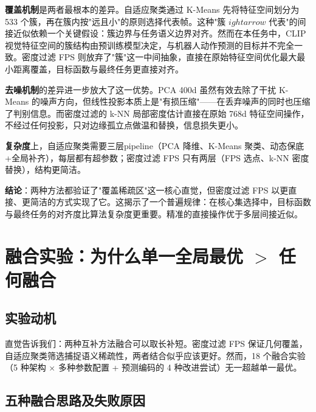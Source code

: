\documentclass[12pt,a4paper]{article}
\begin{document}
\textbf{覆盖机制}是两者最根本的差异。自适应聚类通过 K-Means 先将特征空间划分为 533 个簇，再在簇内按"远且小"的原则选择代表帧。这种"簇 $
ightarrow$ 代表"的间接近似依赖一个关键假设：簇边界与任务语义边界对齐。然而在本任务中，CLIP 视觉特征空间的簇结构由预训练模型决定，与机器人动作预测的目标并不完全一致。密度过滤 FPS 则放弃了"簇"这一中间抽象，直接在原始特征空间优化最大最小距离覆盖，目标函数与最终任务更直接对齐。

\textbf{去噪机制}的差异进一步放大了这一优势。PCA 400d 虽然有效去除了干扰 K-Means 的噪声方向，但线性投影本质上是"有损压缩"——在丢弃噪声的同时也压缩了判别信息。而密度过滤的 k-NN 局部密度估计直接在原始 768d 特征空间操作，不经过任何投影，只对边缘孤立点做温和替换，信息损失更小。

\textbf{复杂度}上，自适应聚类需要三层pipeline（PCA 降维、K-Means 聚类、动态保底+全局补齐），每层都有超参数；密度过滤 FPS 只有两层（FPS 选点、k-NN 密度替换），结构更简洁。

\textbf{结论}：两种方法都验证了"覆盖稀疏区"这一核心直觉，但密度过滤 FPS 以更直接、更简洁的方式实现了它。这揭示了一个普遍规律：在核心集选择中，目标函数与最终任务的对齐度比算法复杂度更重要。精准的直接操作优于多层间接近似。


\section{融合实验：为什么单一全局最优 $>$ 任何融合}
\label{sec:fusion}

\subsection{实验动机}

直觉告诉我们：两种互补方法融合可以取长补短。密度过滤 FPS 保证几何覆盖，自适应聚类筛选捕捉语义稀疏性，两者结合似乎应该更好。然而，18 个融合实验（5 种架构 $\times$ 多种参数配置 + 预测编码的 4 种改进尝试）无一超越单一最优。

\subsection{五种融合思路及失败原因}
\end{document}
